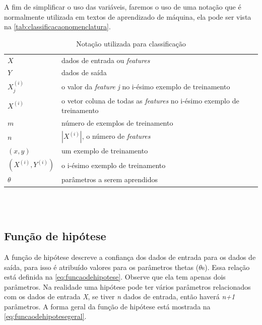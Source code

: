 A fim de simplificar o uso das variáveis, faremos o uso de uma notação que é normalmente utilizada em textos de aprendizado de máquina, ela pode ser vista na \autoref{tab:classificacaonomenclatura}.

\begin{table}[!htb]
\caption{Notação utilizada para classificação} \label{tab:classificacaonomenclatura}
\begin{center}
\begin{tabular}{m{2cm}m{14.0cm}}
  \toprule
  $X$ & dados de entrada ou \textit{features} \\
  $Y$ & dados de saída \\
  $X_j^{(i)}$ & o valor da \textit{feature} \textit{j} no i-ésimo exemplo de treinamento \\
  $X^{(i)}$ & o vetor coluna de todas as \textit{features} no i-ésimo exemplo de treinamento \\
  $m$ & número de exemplos de treinamento \\
  $n$ & $|X^{(i)}|$, o número de \textit{features} \\
  $(x, y)$ & um exemplo de treinamento \\
  $(X^{(i)}, Y^{(i)})$ & o i-ésimo exemplo de treinamento \\
  $\theta$ & parâmetros a serem aprendidos \\
  \bottomrule
\end{tabular}
\end{center}

\end{table}



\ \\
\ \\

\subsection{Função de hipótese}

A função de hipótese descreve a confiança dos dados de entrada para os dados de saída, para isso é atribuído valores para os parâmetros thetas ($\theta$s). Essa relação está definida na \autoref{eq:funcaodehipotese}. Observe que ela tem apenas dois parâmetros. Na realidade uma hipótese pode ter vários parâmetros relacionados com os dados de entrada \textit{X}, se tiver \textit{n} dados de entrada, então haverá \textit{n+1} parâmetros. A forma geral da função de hipótese está mostrada na \autoref{eq:funcaodehipotesegeral}.

